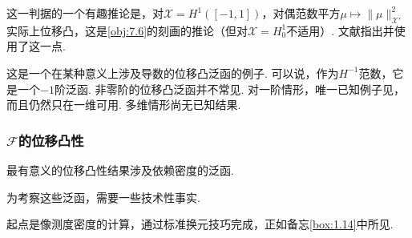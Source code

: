 这一判据的一个有趣推论是，对$\mathscr X=H^1([-1,1])$，对偶范数平方$\mu\mapsto\|\mu\|_{\mathscr X'}^2$实际上位移凸，这是\autoref{obj:7.6}的刻画的推论（但对$\mathscr X=H_0^1$不适用）. 文献\cite{b62,b110}指出并使用了这一点.

这是一个在某种意义上涉及导数的位移凸泛函的例子. 可以说，作为$H^{-1}$范数，它是一个$-1$阶泛函. 非零阶的位移凸泛函并不常见. 对一阶情形，唯一已知例子见\cite{b115}，而且仍然只在一维可用. 多维情形尚无已知结果.

\subsubsection[密度泛函的位移凸性]{$\mathscr F$的位移凸性}\label{sec:7.3.2}
最有意义的位移凸性结果涉及依赖密度的泛函.

为考察这些泛函，需要一些技术性事实.

起点是像测度密度的计算，通过标准换元技巧完成，正如备忘\autoref{box:1.14}中所见.

